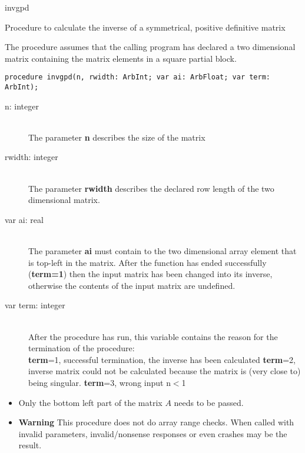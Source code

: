 \documentclass{report}
\newcommand{\FunctionDescription}{\item[Description]\rmfamily}
\newcommand{\Dataorganisation}{\item[Data Struct]\rmfamily}
\newcommand{\DeclarationandParams}{\item[Declaration]\rmfamily}
\newcommand{\Remarks}{\item[Remarks]\rmfamily}
\begin{document}
\begin{procedure}{invgpd}

\FunctionDescription

Procedure to calculate the inverse of a symmetrical, positive
definitive matrix

\Dataorganisation The procedure assumes that the calling program has
declared a two dimensional matrix containing the matrix elements in
a square partial block.

\DeclarationandParams

\lstinline|procedure invgpd(n, rwidth: ArbInt; var ai: ArbFloat; var term: ArbInt);|

\begin{description}
 \item[n: integer] \mbox{ } \\
    The parameter {\bf n} describes the size of the matrix
 \item[rwidth: integer] \mbox{} \\
    The parameter {\bf rwidth} describes the declared row length of the two dimensional
    matrix.
 \item[var ai: real] \mbox{} \\
    The parameter {\bf ai} must contain to the two dimensional array element
    that is top-left in the matrix.
    After the function has ended successfully (\textbf{term=1}) then
    the input matrix has been changed into its inverse, otherwise the contents 
    of the input matrix are undefined.
 \item[var term: integer]  \mbox{} \\
    After the procedure has run, this variable contains the reason for 
    the termination of the procedure:\\
      {\bf term}=1, successful termination, the inverse has been calculated
      {\bf term}=2, inverse matrix could not be calculated because the matrix
		    is (very close to) being singular.
      {\bf term}=3, wrong input n$<$1
\end{description}
\Remarks

\begin{itemize}
\item Only the bottom left part of the matrix $A$ needs to be passed.
\item \textbf{Warning} This procedure does not do array range checks. When called with invalid
parameters, invalid/nonsense responses or even crashes may be the result.
\end{itemize}


\end{procedure}
\end{document}
